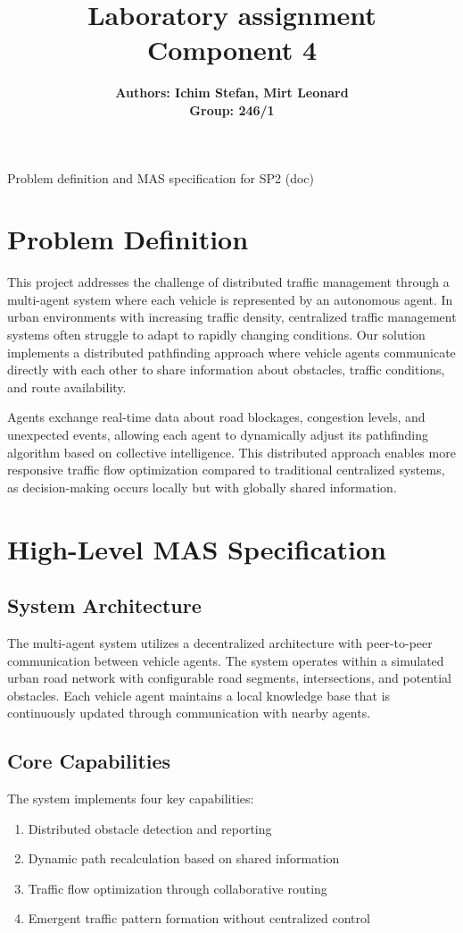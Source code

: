 \documentclass[a4paper, 11pt]{article}
\title{\textbf{Laboratory assignment} \\[1ex] \large \textbf{Component 4}}
\author{\textbf{Authors: Ichim Stefan, Mirt Leonard} \\ \textbf{Group: 246/1}}
\begin{document}
\maketitle
Problem definition and MAS specification for SP2 (doc)
\section{Problem Definition}
This project addresses the challenge of distributed traffic management through a multi-agent system where each vehicle is represented by an autonomous agent. In urban environments with increasing traffic density, centralized traffic management systems often struggle to adapt to rapidly changing conditions. Our solution implements a distributed pathfinding approach where vehicle agents communicate directly with each other to share information about obstacles, traffic conditions, and route availability.

Agents exchange real-time data about road blockages, congestion levels, and unexpected events, allowing each agent to dynamically adjust its pathfinding algorithm based on collective intelligence. This distributed approach enables more responsive traffic flow optimization compared to traditional centralized systems, as decision-making occurs locally but with globally shared information.

\section{High-Level MAS Specification}
\subsection{System Architecture}
The multi-agent system utilizes a decentralized architecture with peer-to-peer communication between vehicle agents. The system operates within a simulated urban road network with configurable road segments, intersections, and potential obstacles. Each vehicle agent maintains a local knowledge base that is continuously updated through communication with nearby agents.

\subsection{Core Capabilities}
The system implements four key capabilities:
\begin{enumerate}
    \item Distributed obstacle detection and reporting
    \item Dynamic path recalculation based on shared information
    \item Traffic flow optimization through collaborative routing
    \item Emergent traffic pattern formation without centralized control
\end{enumerate}
\end{document}

